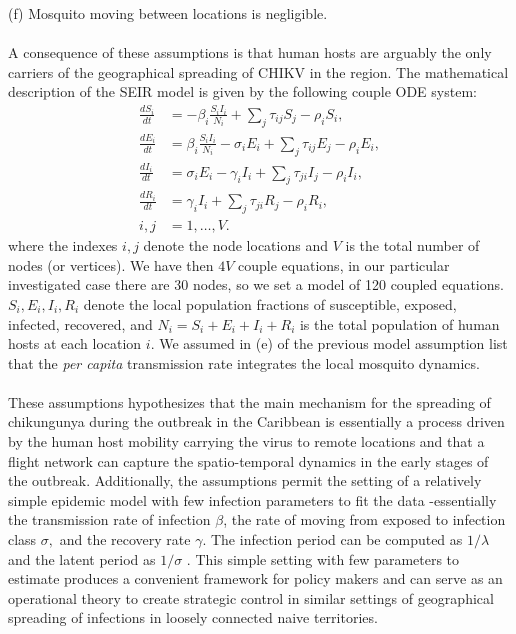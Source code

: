 \documentclass[10pt,a4paper]{article}
\begin{document}
(f) Mosquito moving between locations is negligible.
\\\\
A consequence of these assumptions is that human hosts are arguably the only carriers of the geographical spreading of CHIKV in the region. The mathematical description of the SEIR model is given by the following couple ODE system:
%
\begin{equation}
\label{eq:SEIR}
\begin{split}
\frac{dS_i}{dt} & = -\beta_i\frac{S_iI_i}{N_i}  + \sum _j\tau_{ij}S_j - \rho_iS_i,  \\
\frac{dE_i}{dt} & = \beta_i\frac{S_iI_i}{N_i} - \sigma_iE_i + \sum _j\tau_{ij}E_j - \rho_iE_i, \\
\frac{dI_i}{dt} & = \sigma_iE_i -\gamma_iI_i + \sum_j\tau_{ji}I_j - \rho_iI_i, \\
\frac{dR_i}{dt } & = \gamma_iI_i + \sum_j\tau_{ji}R_j - \rho_iR_i,\\
i,j &= 1,\dots , V.
\end{split}
\end{equation}
%
where the indexes $i,j$ denote the node locations and $V$ is the total number of nodes (or vertices). We have then $4V$ couple equations, in our particular investigated case there are 30 nodes, so we set a model of 120 coupled equations. $S_i, E_i,I_i, R_i$ denote the local population fractions of susceptible, exposed, infected, recovered, and $N_i=S_i+E_i+I_i+R_i$ is the total population of human hosts at each location $i$. 
%
We assumed in (e) of the previous model assumption list that the \textit{per capita} transmission rate integrates the local mosquito dynamics. 
\\\\
These assumptions hypothesizes that the main mechanism for the spreading of chikungunya during the outbreak in the Caribbean is essentially a process driven by the human host mobility carrying the virus to remote locations and that a flight network can capture the spatio-temporal dynamics in the early stages of the outbreak.  Additionally, the assumptions permit the setting of a relatively simple epidemic model with few infection parameters to fit the data -essentially the transmission rate of infection $\beta$, the rate of moving from exposed to infection class $\sigma,$ and the recovery rate $\gamma$. The infection period can be computed as $1/\lambda$ and the latent period as $1/\sigma$ \citep{keeling2008modeling}. This simple setting with few parameters to estimate produces a convenient framework for policy makers and can serve as an operational theory to create strategic control in similar settings of geographical spreading of infections in loosely connected naive territories.  
%
\end{document}

